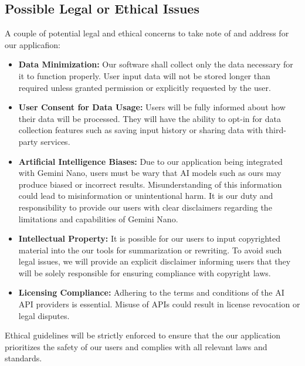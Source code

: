 \documentclass{article}
\begin{document}
\subsection{Possible Legal or Ethical Issues}
A couple of potential legal and ethical concerns to take note of and address for our applicafion:
\begin{itemize}
    \item \textbf{Data Minimization:} Our software shall collect only the data necessary for it to function properly. User input data will not be stored longer than required unless granted permission or explicitly requested by the user.
    \item \textbf{User Consent for Data Usage:} Users will be fully informed about how their data will be processed. They will have the ability to opt-in for data collection features such as saving input history or sharing data with third-party services.
    \item \textbf{Artificial Intelligence Biases:} Due to our application being integrated with Gemini Nano, users must be wary that AI models such as ours may produce biased or incorrect results. Misunderstanding of this information could lead to misinformation or unintentional harm. It is our duty and responsibility to provide our users with clear disclaimers regarding the limitations and capabilities of Gemini Nano.
    \item \textbf{Intellectual Property:} It is possible for our users to input copyrighted material into the our tools for summarization or rewriting. To avoid such legal issues, we will provide an explicit disclaimer informing users that they will be solely responsible for ensuring compliance with copyright laws.
    \item \textbf{Licensing Compliance:} Adhering to the terms and conditions of the AI API providers is essential. Misuse of APIs could result in license revocation or legal disputes.
\end{itemize}
Ethical guidelines will be strictly enforced to ensure that the our application prioritizes the safety of our users and complies with all relevant laws and standards.
\end{document}
